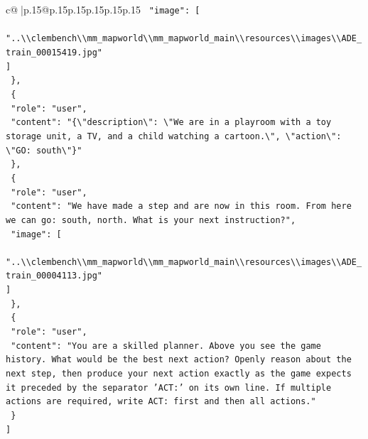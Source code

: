 \documentclass{article}
\begin{document}
{\begin{supertabular}{c@{$\;$}|p{.15\linewidth}@{}p{.15\linewidth}p{.15\linewidth}p{.15\linewidth}p{.15\linewidth}p{.15\linewidth}}
{{{\texttt{    "image": {[}} \\
\texttt{      "..\textbackslash{}\textbackslash{}clembench\textbackslash{}\textbackslash{}mm\_mapworld\textbackslash{}\textbackslash{}mm\_mapworld\_main\textbackslash{}\textbackslash{}resources\textbackslash{}\textbackslash{}images\textbackslash{}\textbackslash{}ADE\_train\_00015419.jpg"} \\
\texttt{    {]}} \\
\texttt{  \},} \\
\texttt{  \{} \\
\texttt{    "role": "user",} \\
\texttt{    "content": "\{\textbackslash{}"description\textbackslash{}": \textbackslash{}"We are in a playroom with a toy storage unit, a TV, and a child watching a cartoon.\textbackslash{}", \textbackslash{}"action\textbackslash{}": \textbackslash{}"GO: south\textbackslash{}"\}"} \\
\texttt{  \},} \\
\texttt{  \{} \\
\texttt{    "role": "user",} \\
\texttt{    "content": "We have made a step and are now in this room. From here we can go: south, north. What is your next instruction?",} \\
\texttt{    "image": {[}} \\
\texttt{      "..\textbackslash{}\textbackslash{}clembench\textbackslash{}\textbackslash{}mm\_mapworld\textbackslash{}\textbackslash{}mm\_mapworld\_main\textbackslash{}\textbackslash{}resources\textbackslash{}\textbackslash{}images\textbackslash{}\textbackslash{}ADE\_train\_00004113.jpg"} \\
\texttt{    {]}} \\
\texttt{  \},} \\
\texttt{  \{} \\
\texttt{    "role": "user",} \\
\texttt{    "content": "You are a skilled planner. Above you see the game history. What would be the best next action? Openly reason about the next step, then produce your next action exactly as the game expects it preceded by the separator 'ACT:' on its own line. If multiple actions are required, write ACT: first and then all actions."} \\
\texttt{  \}} \\
\texttt{{]}} \\
            }
        }
    }
     \\ \\


\end{supertabular}}
\end{document}

